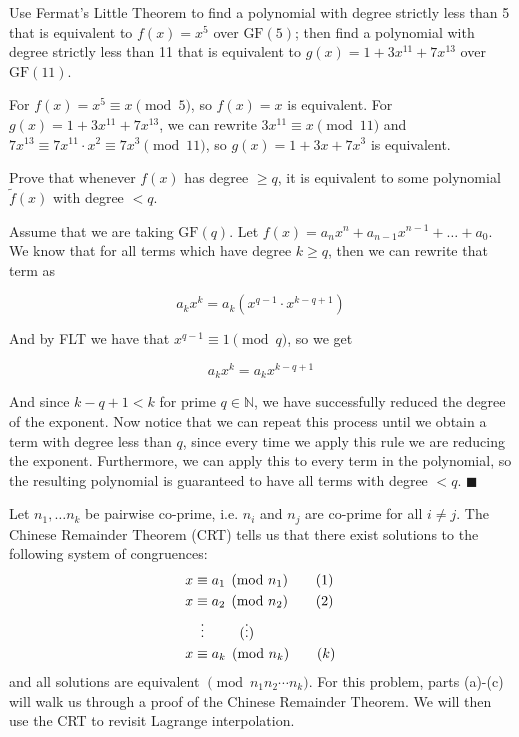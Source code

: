 \documentclass[11pt]{article}
\begin{document}
\begin{Parts}
    \Part Use Fermat's Little Theorem to find a polynomial with degree strictly less than 5 that is equivalent to $f(x) = x^5$ over $\text{GF}(5)$; then find a polynomial with degree strictly less than 11 that is equivalent to $g(x) = 1 + 3x^{11} + 7x^{13}$ over $\text{GF}(11)$.

    \begin{solution}
        For $f(x) = x^5 \equiv x \pmod 5$, so $f(x) = x$ is equivalent. For $g(x) = 1 + 3x^11 + 7x^13$, we can rewrite $3x^11 \equiv x \pmod{11}$ and $7x^{13} \equiv 7 x^11 \cdot x^{2} \equiv 7x^3 \pmod{11}$, so $g(x)  = 1 + 3x + 7x^3$ is equivalent.  
    \end{solution}

    \Part Prove that whenever $f(x)$ has degree $\ge q$, it is equivalent to some polynomial $\tilde f(x)$ with degree $< q$.

    \begin{solution}
        Assume that we are taking $\text{GF}(q)$. Let $f(x) = a_nx^n + a_{n-1}x^{n-1} + \dots + a_0$. We know that for all terms which have degree $k \ge q$, then we can rewrite that term as

        \[ a_kx^k = a_k\left( x^{q - 1} \cdot x^{k - q + 1}\right)\] 

        And by FLT we have that $x^{q  - 1}\equiv 1 \pmod q$, so we get
        
        \[a_kx^k =  a_k x^{k - q + 1}\]
        
        And since $k - q +1 < k$ for prime $q \in \mathbb N$, we have successfully reduced the degree of the exponent. Now notice that we can repeat this process until we obtain a term with degree less than $q$, since every time we apply this rule we are reducing the exponent. Furthermore, we can apply this to every term in the polynomial, so the resulting polynomial is guaranteed to have all terms with degree $< q$. $\blacksquare$
    \end{solution}
\end{Parts}

\pagebreak
{}

Let $n_1, \ldots n_k$ be pairwise co-prime, i.e. $n_i$ and $n_j$ are co-prime for all $i \neq j$. The Chinese Remainder Theorem (CRT) tells us that there exist solutions to the following system of congruences:
\begin{align}
    x &\equiv a_1 \pmod{n_1} \tag{1} \\
    x &\equiv a_2 \pmod{n_2} \tag{2} \\
    &\vdotswithin{\equiv} \tag{$\vdots$} \\
    x &\equiv a_k \pmod{n_k} \tag{$k$}
\end{align}
and all solutions are equivalent $\pmod{n_1 n_2 \cdots n_k}$. For this problem, parts (a)-(c) will walk us through a proof of the Chinese Remainder Theorem.
We will then use the CRT to revisit Lagrange interpolation.
\end{document}
